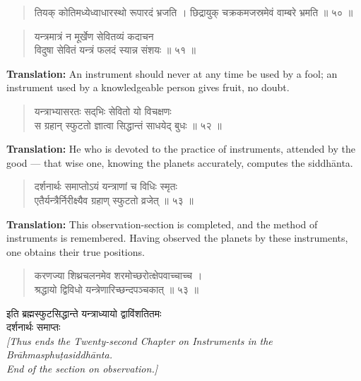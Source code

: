 \documentclass[11pt,a4paper]{article}
\newcommand{\dev}[1]{{\devanagarifont #1}}
\newenvironment{shloka}{\begin{verse}\devanagarifont\large}{\end{verse}}
\begin{document}
\vspace{0.5cm}

\begin{shloka}
तियक् कोतिमध्येध्वाधारस्थो रूपारदं भ्रजति ।
छिद्रायुक् चक्रकमजस्रमेवं वाम्बरे भ्रमति ॥ ५० ॥
\end{shloka}

\vspace{0.3cm}

\begin{shloka}
यन्त्रमात्रं न मूर्खेण सेवितव्यं कदाचन \\
विदुषा सेवितं यन्त्रं फलदं स्यान्न संशयः ॥ ५१ ॥
\end{shloka}

\textbf{Translation:}\quad
An instrument should never at any time be used by a fool; an
instrument used by a knowledgeable person gives fruit, no doubt.

\vspace{0.3cm}

\begin{shloka}
यन्त्राभ्यासरतः सद्‌भिः सेवितो यो विचक्षणः \\
स ग्रहान् स्फुटतो ज्ञात्वा सिद्धान्तं साधयेद् बुधः ॥ ५२ ॥
\end{shloka}

\textbf{Translation:}\quad
He who is devoted to the practice of instruments, attended by the
good — that wise one, knowing the planets accurately, computes the
siddhānta.

\vspace{0.3cm}

\begin{shloka}
दर्शनार्थः समाप्तोऽयं यन्त्राणां च विधिः स्मृतः \\
एतैर्यन्त्रैर्निरीक्ष्यैव ग्रहाण् स्फुटतो व्रजेत् ॥ ५३ ॥
\end{shloka}

\textbf{Translation:}\quad
This observation-section is completed, and the method of instruments
is remembered. Having observed the planets by these instruments, one
obtains their true positions.

\begin{shloka}
करणज्या शिथ्रचलनमेव शरमोच्छरोत्क्षेपवाच्चाच्च ।\\
श्रद्धायो द्विविधो यन्त्रेणारिच्छन्दपञ्चकात् ॥ ५३ ॥
\end{shloka}

\vspace{0.5cm}

\begin{center}
\dev{इति ब्रह्मस्फुटसिद्धान्ते यन्त्राध्यायो द्वाविंशतितमः}\\[0.3cm]
\dev{दर्शनार्थः समाप्तः}\\[0.3cm]
\textit{[Thus ends the Twenty-second Chapter on Instruments in the
Brāhmasphuṭasiddhānta.\\
End of the section on observation.]}
\end{center}
\end{document}
